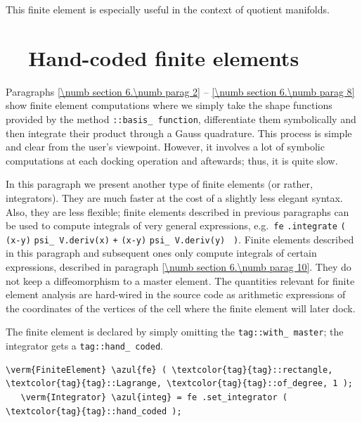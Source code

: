 This finite element is especially useful in the context of quotient manifolds.


\section{~~Hand-coded finite elements}\label{\numb section 6.\numb parag 9}

Paragraphs \ref{\numb section 6.\numb parag 2} -- \ref{\numb section 6.\numb parag 8}
show finite element computations where we simply take the shape functions provided by
the method {\small\tt{}::basis\_\,function}, differentiate them
symbolically and then integrate their product through a Gauss quadrature.
This process is simple and clear from the user's viewpoint.
However, it involves a lot of symbolic computations at each docking operation and aftewards;
thus, it is quite slow.

In this paragraph we present another type of finite elements (or rather, integrators).
They are much faster at the cost of a slightly less elegant syntax.
Also, they are less flexible; finite elements described in previous paragraphs can be used
to compute integrals of very general expressions, e.g.\ {\small\tt fe} {\small\tt .integrate}
{\small\tt(} {\small\tt{}} {\small\tt(x-y)} {\small\tt *} {\small\tt psi\_\,V.deriv(x)}
{\small\tt +} {\small\tt{}} {\small\tt(x-y)} {\small\tt *} {\small\tt psi\_\,V.deriv(y)}%
~{\small\tt )}.
Finite elements described in this paragraph and subsequent ones only compute integrals
of certain expressions, described in paragraph \ref{\numb section 6.\numb parag 10}.
They do not keep a diffeomorphism to a master element.
The quantities relevant for finite element analysis are hard-wired in the source code
as arithmetic expressions
of the coordinates of the vertices of the cell where the finite element will later dock.

The finite element is declared by simply omitting the
{\small\tt\textcolor{tag}{tag}::with\_\,master}; the integrator gets a
{\small\tt\textcolor{tag}{tag}::hand\_\,coded}.

\begin{Verbatim}[commandchars=\\\{\},formatcom=\small\tt,frame=single,
   label=parag-\ref{\numb section 6.\numb parag 9}.cpp,rulecolor=\color{moldura},
   baselinestretch=0.94,framesep=2mm                                            ]
   \verm{FiniteElement} \azul{fe} ( \textcolor{tag}{tag}::rectangle, \textcolor{tag}{tag}::Lagrange, \textcolor{tag}{tag}::of_degree, 1 );
   \verm{Integrator} \azul{integ} = fe .set_integrator ( \textcolor{tag}{tag}::hand_coded );
\end{Verbatim}

